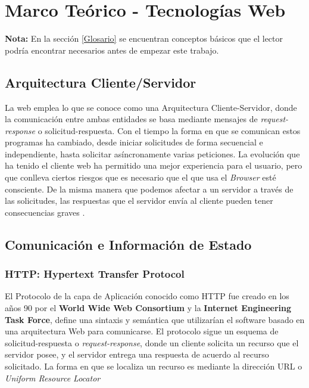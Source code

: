 \chapter{Marco Teórico - Tecnologías Web}
\label{chap2:MT}

\textbf{Nota:} En la sección \ref{Glosario} se encuentran conceptos básicos que el lector podría encontrar necesarios antes de empezar este trabajo.

\section{Arquitectura Cliente/Servidor}
    \label{chap2:ArqCS}
    La web emplea lo que se conoce como una Arquitectura Cliente-Servidor, donde la comunicación entre ambas entidades se basa mediante mensajes de \textit{request-response} o solicitud-respuesta. Con el tiempo la forma en que se comunican estos programas ha cambiado, desde iniciar solicitudes de forma secuencial e independiente, hasta solicitar asíncronamente varias peticiones. La evolución que ha tenido el cliente web ha permitido una mejor experiencia para el usuario, pero que conlleva ciertos riesgos que es necesario que el que usa el \textit{Browser} esté consciente. De la misma manera que podemos afectar a un servidor a través de las solicitudes, las respuestas que el servidor envía al cliente pueden tener consecuencias graves \cite{alcorn2014browser}.


\section{Comunicación e Información de Estado}

    \subsection{HTTP: Hypertext Transfer Protocol}
    \label{chap2:HTTP}
    El Protocolo de la capa de Aplicación conocido como HTTP fue creado en los años 90 por el \textbf{World Wide Web Consortium} \cite{w3c} y la \textbf{Internet Engineering Task Force}, define una sintaxis y semántica que utilizarían el software basado en una arquitectura Web para comunicarse. El protocolo sigue un esquema de solicitud-respuesta o \textit{request-response}, donde un cliente solicita un recurso que el servidor posee, y el servidor entrega una respuesta de acuerdo al recurso solicitado. La forma en que se localiza un recurso es mediante la dirección URL o \textit{Uniform Resource Locator}

